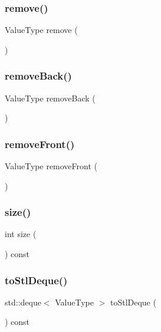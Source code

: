 \subsubsection{\texorpdfstring{remove()}{remove()}}
{\footnotesize\ttfamily Value\+Type remove (\begin{DoxyParamCaption}{ }\end{DoxyParamCaption})}

\mbox{\label{classDeque_af7878e9c2f67e06cbae525e9fa77e38e}} 
\subsubsection{\texorpdfstring{remove\+Back()}{removeBack()}}
{\footnotesize\ttfamily Value\+Type remove\+Back (\begin{DoxyParamCaption}{ }\end{DoxyParamCaption})}

\mbox{\label{classDeque_a02453aa96e93c38ca4c1d176307c8a63}} 
\subsubsection{\texorpdfstring{remove\+Front()}{removeFront()}}
{\footnotesize\ttfamily Value\+Type remove\+Front (\begin{DoxyParamCaption}{ }\end{DoxyParamCaption})}

\mbox{\label{classDeque_af9593d4a5ff4274efaf429cb4f9e57cc}} 
\subsubsection{\texorpdfstring{size()}{size()}}
{\footnotesize\ttfamily int size (\begin{DoxyParamCaption}{ }\end{DoxyParamCaption}) const}

\mbox{\label{classDeque_a577546d159bb5d7237f506789f2beafd}} 
\subsubsection{\texorpdfstring{to\+Stl\+Deque()}{toStlDeque()}}
{\footnotesize\ttfamily std\+::deque$<$ Value\+Type $>$ to\+Stl\+Deque (\begin{DoxyParamCaption}{ }\end{DoxyParamCaption}) const}

